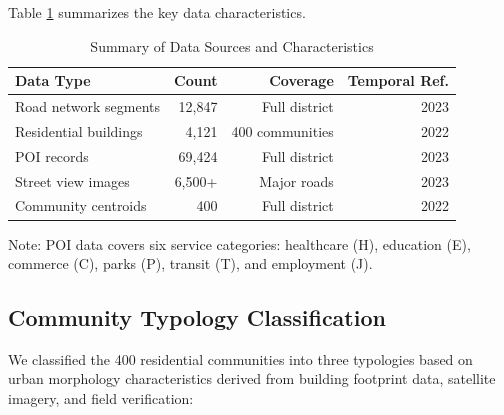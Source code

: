 \documentclass[10pt,conference,compsoc]{IEEEtran}
\begin{document}
Table \ref{tab:data_summary} summarizes the key data characteristics.

\begin{table}[htbp]
\caption{Summary of Data Sources and Characteristics}
\label{tab:data_summary}
\begin{center}
\begin{threeparttable}
\begin{tabular}{lrrr}
\toprule
Data Type & Count & Coverage & Temporal Ref. \\
\midrule
Road network segments & 12,847 & Full district & 2023 \\
Residential buildings & 4,121 & 400 communities & 2022 \\
POI records & 69,424 & Full district & 2023 \\
Street view images & 6,500+ & Major roads & 2023 \\
Community centroids & 400 & Full district & 2022 \\
\bottomrule
\end{tabular}
\begin{tablenotes}
\item Note: POI data covers six service categories: healthcare (H), education (E), commerce (C), parks (P), transit (T), and employment (J).
\end{tablenotes}
\end{threeparttable}
\end{center}
\end{table}

\subsection{Community Typology Classification}

We classified the 400 residential communities into three typologies based on urban morphology characteristics derived from building footprint data, satellite imagery, and field verification:
\end{document}
